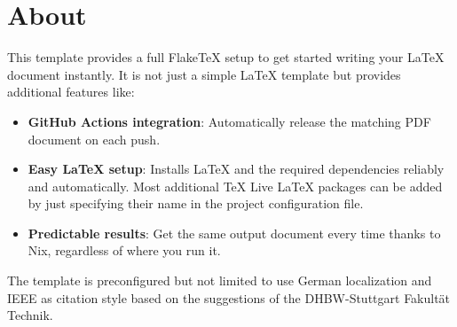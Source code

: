 \section{About}\label{sec:about}

This template provides a full FlakeTeX\parencite{noauthor_hfxbsenixos-config_nodate} setup to get started writing your
LaTeX document instantly.
It is not just a simple LaTeX template but provides additional features like:

\begin{itemize}
    \item{
        \textbf{GitHub Actions integration}:
        Automatically release the matching PDF document on each push.
    }
    \item{
        \textbf{Easy LaTeX setup}:
        Installs LaTeX and the required dependencies reliably and automatically.
        Most additional TeX Live LaTeX packages can be added by just specifying their name in the project configuration
        file.
    }
    \item {
        \textbf{Predictable results}:
        Get the same output document every time thanks to Nix, regardless of where you run it.
    }
\end{itemize}

The template is preconfigured but not limited to use German localization and IEEE as citation style based on the
suggestions of the DHBW-Stuttgart Fakultät Technik\parencite{frech_leitlinien_2016}.
